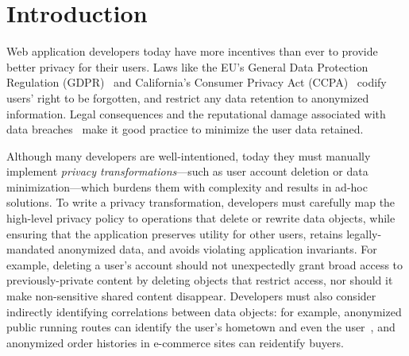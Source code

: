 \section{Introduction}
Web application developers today have more incentives than ever to provide better privacy for their
users.
%
Laws like the EU's General Data Protection Regulation (GDPR)~\cite{eu:gdpr} and California's
Consumer Privacy Act (CCPA)~\cite{ca:privacy-act} codify users' right to be forgotten, and restrict
any data retention to anonymized information.
%
Legal consequences and the reputational damage associated with data breaches~\cite{breach:amazon,
breach:twitter, breach:fb, breach:marriott, breach:quora} make it good practice to minimize the user
data retained.
%

%
Although many developers are well-intentioned, today they must manually implement \emph{privacy
transformations}---such as user account deletion or data minimization---which burdens
them with complexity and results in ad-hoc solutions. %
%
%
To write a privacy transformation, developers must carefully map the high-level privacy policy to
operations that delete or rewrite data objects, while ensuring that the application preserves
utility for other users, retains legally-mandated anonymized data, and avoids violating application
invariants.
%
For example, deleting a user's account should not unexpectedly grant broad access to
previously-private content by deleting objects that restrict access, nor should it make
non-sensitive shared content disappear.
%
Developers must also consider indirectly identifying correlations between data objects: for example,
anonymized public running routes can identify the user's hometown and even the
user~\cite{strava:heatmap}, and anonymized order histories in e-commerce sites can reidentify
buyers.

